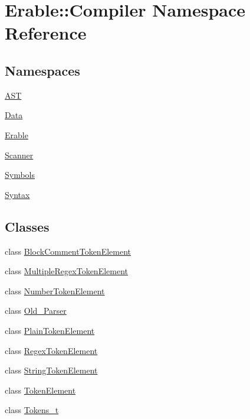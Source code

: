 \hypertarget{namespace_erable_1_1_compiler}{}\section{Erable\+::Compiler Namespace Reference}
\label{namespace_erable_1_1_compiler}
\subsection*{Namespaces}
\begin{DoxyCompactItemize}
\item 
 \mbox{\hyperlink{namespace_erable_1_1_compiler_1_1_a_s_t}{A\+ST}}
\item 
 \mbox{\hyperlink{namespace_erable_1_1_compiler_1_1_data}{Data}}
\item 
 \mbox{\hyperlink{namespace_erable_1_1_compiler_1_1_erable}{Erable}}
\item 
 \mbox{\hyperlink{namespace_erable_1_1_compiler_1_1_scanner}{Scanner}}
\item 
 \mbox{\hyperlink{namespace_erable_1_1_compiler_1_1_symbols}{Symbols}}
\item 
 \mbox{\hyperlink{namespace_erable_1_1_compiler_1_1_syntax}{Syntax}}
\end{DoxyCompactItemize}
\subsection*{Classes}
\begin{DoxyCompactItemize}
\item 
class \mbox{\hyperlink{class_erable_1_1_compiler_1_1_block_comment_token_element}{Block\+Comment\+Token\+Element}}
\item 
class \mbox{\hyperlink{class_erable_1_1_compiler_1_1_multiple_regex_token_element}{Multiple\+Regex\+Token\+Element}}
\item 
class \mbox{\hyperlink{class_erable_1_1_compiler_1_1_number_token_element}{Number\+Token\+Element}}
\item 
class \mbox{\hyperlink{class_erable_1_1_compiler_1_1_old___parser}{Old\+\_\+\+Parser}}
\item 
class \mbox{\hyperlink{class_erable_1_1_compiler_1_1_plain_token_element}{Plain\+Token\+Element}}
\item 
class \mbox{\hyperlink{class_erable_1_1_compiler_1_1_regex_token_element}{Regex\+Token\+Element}}
\item 
class \mbox{\hyperlink{class_erable_1_1_compiler_1_1_string_token_element}{String\+Token\+Element}}
\item 
class \mbox{\hyperlink{class_erable_1_1_compiler_1_1_token_element}{Token\+Element}}
\item 
class \mbox{\hyperlink{class_erable_1_1_compiler_1_1_tokens__t}{Tokens\+\_\+t}}
\end{DoxyCompactItemize}
